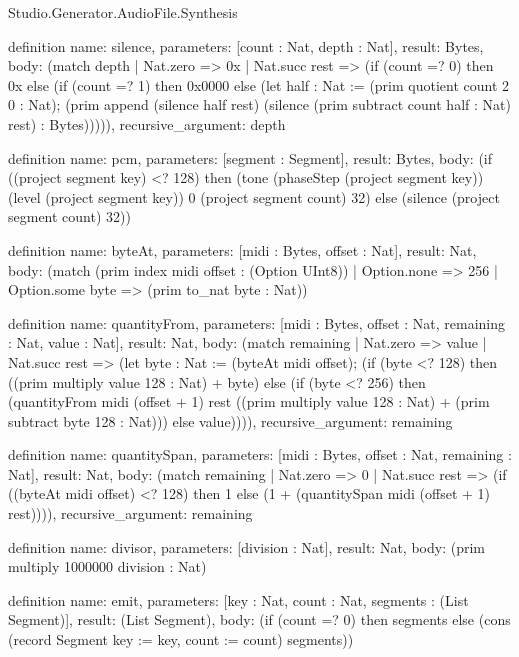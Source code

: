 \begin{lexlean}{Studio.Generator.AudioFile.Synthesis}
\begin{semanticmodule}
definition{
  name: silence,
  parameters: [count : Nat, depth : Nat],
  result: Bytes,
  body: (match depth
    | Nat.zero => 0x
    | Nat.succ rest => (if (count =? 0) then 0x else (if (count =? 1) then 0x0000 else (let half : Nat := (prim quotient count 2 0 : Nat); (prim append (silence half rest) (silence (prim subtract count half : Nat) rest) : Bytes))))),
  recursive_argument: depth
}

definition{
  name: pcm,
  parameters: [segment : Segment],
  result: Bytes,
  body: (if ((project segment key) <? 128) then (tone (phaseStep (project segment key)) (level (project segment key)) 0 (project segment count) 32) else (silence (project segment count) 32))
}

definition{
  name: byteAt,
  parameters: [midi : Bytes, offset : Nat],
  result: Nat,
  body: (match (prim index midi offset : (Option UInt8))
    | Option.none => 256
    | Option.some byte => (prim to_nat byte : Nat))
}

definition{
  name: quantityFrom,
  parameters: [midi : Bytes, offset : Nat, remaining : Nat, value : Nat],
  result: Nat,
  body: (match remaining
    | Nat.zero => value
    | Nat.succ rest => (let byte : Nat := (byteAt midi offset); (if (byte <? 128) then ((prim multiply value 128 : Nat) + byte) else (if (byte <? 256) then (quantityFrom midi (offset + 1) rest ((prim multiply value 128 : Nat) + (prim subtract byte 128 : Nat))) else value)))),
  recursive_argument: remaining
}

definition{
  name: quantitySpan,
  parameters: [midi : Bytes, offset : Nat, remaining : Nat],
  result: Nat,
  body: (match remaining
    | Nat.zero => 0
    | Nat.succ rest => (if ((byteAt midi offset) <? 128) then 1 else (1 + (quantitySpan midi (offset + 1) rest)))),
  recursive_argument: remaining
}

definition{
  name: divisor,
  parameters: [division : Nat],
  result: Nat,
  body: (prim multiply 1000000 division : Nat)
}

definition{
  name: emit,
  parameters: [key : Nat, count : Nat, segments : (List Segment)],
  result: (List Segment),
  body: (if (count =? 0) then segments else (cons (record Segment {key := key, count := count}) segments))
}


\end{semanticmodule}
\end{lexlean}
